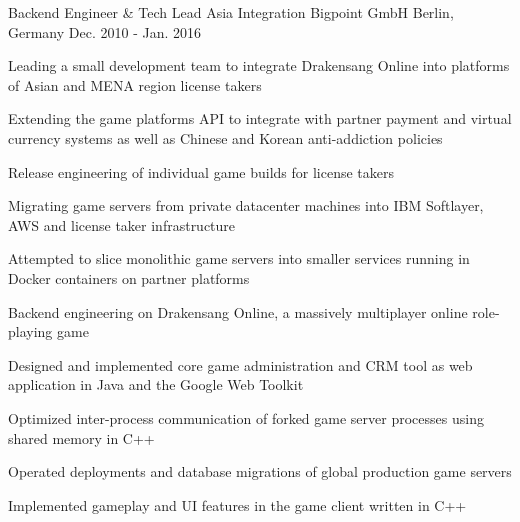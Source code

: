 \begin{cventries}
  \cventry
    {Backend Engineer \& Tech Lead Asia Integration} %
    {Bigpoint GmbH} %
    {Berlin, Germany} %
    {Dec. 2010 - Jan. 2016} %
    {
      \begin{cvitems} %
        \item {Leading a small development team to integrate Drakensang Online into platforms of Asian and MENA region license takers}
        \begin{cvsubitems}
          \item {Extending the game platforms API to integrate with partner payment and virtual currency systems as well as Chinese and Korean anti-addiction policies}
          \item {Release engineering of individual game builds for license takers}
          \item {Migrating game servers from private datacenter machines into IBM Softlayer, AWS and license taker infrastructure}
          \item {Attempted to slice monolithic game servers into smaller services running in Docker containers on partner platforms}
        \end{cvsubitems}
        \item {Backend engineering on Drakensang Online, a massively multiplayer online role-playing game}
        \begin{cvsubitems}
          \item {Designed and implemented core game administration and CRM tool as web application in Java and the Google Web Toolkit}
          \item {Optimized inter-process communication of forked game server processes using shared memory in C++}
          \item {Operated deployments and database migrations of global production game servers}
          \item {Implemented gameplay and UI features in the game client written in C++}
        \end{cvsubitems}
      \end{cvitems}
    }


\end{cventries}

